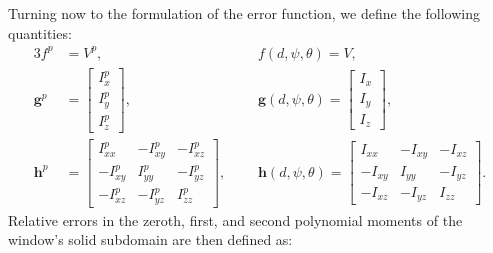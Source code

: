 Turning now to the formulation of the error function, we define the following quantities:
\begin{alignat}{3}
f^p &= V^p, \text{\ \ \ \ \ }&&f(d,\psi,\theta) = V, \\
\bm{g}^p &= \left[\begin{array} {ccc} {I_x^p} \\ {I_y^p} \\ {I_z^p} \end{array} \right], \text{\ \ \ \ \ }&&\bm{g}(d,\psi,\theta) = \left[\begin{array} {ccc} {I_x} \\ {I_y} \\ {I_z} \end{array} \right], \\
\bm{h}^p &= \left[\begin{array} {ccc} {I_{xx}^p} & {-I_{xy}^p} & {-I_{xz}^p}\\ {-I_{xy}^p} & {I_{yy}^p} & {-I_{yz}^p} \\ -{I_{xz}^p} & {-I_{yz}^p} & {I_{zz}^p} \end{array} \right],\text{\ \ \ \ \ \ \ }&&\bm{h}(d,\psi,\theta) = \left[\begin{array} {ccc} {I_{xx}} & {-I_{xy}} & {-I_{xz}}\\ {-I_{xy}} & {I_{yy}} & {-I_{yz}} \\ -{I_{xz}} & {-I_{yz}} & {I_{zz}} \end{array} \right].
\end{alignat}
Relative errors in the zeroth, first, and second polynomial moments of the window's solid subdomain are then defined as:

